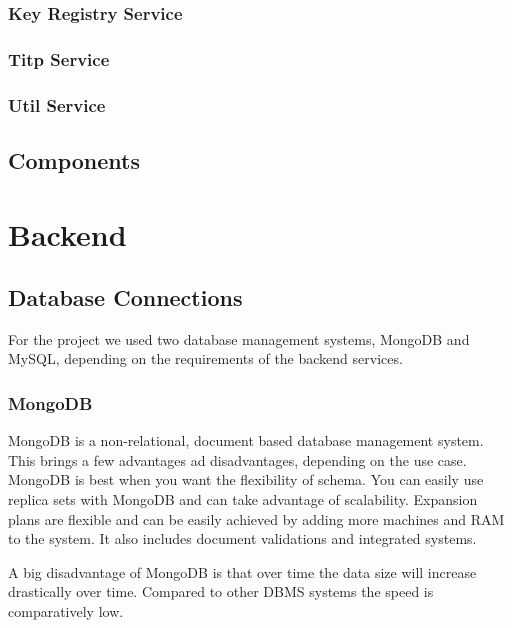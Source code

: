 \subsubsection{Key Registry Service}

\subsubsection{Titp Service}

\subsubsection{Util Service}

\subsection{Components}\label{subsec:components}


\section{Backend}\label{sec:backend}

\subsection{Database Connections}\label{subsec:database-connections}

For the project we used two database management systems, MongoDB and MySQL, depending on the requirements of the backend
services.

\subsubsection{MongoDB}
MongoDB is a non-relational, document based database management system.
This brings a few advantages ad disadvantages, depending on the use case.
MongoDB is best when you want the flexibility of schema.
You can easily use replica sets with MongoDB and can take advantage of scalability.
Expansion plans are flexible and can be easily achieved by adding more machines and RAM to the system.
It also includes document validations and integrated systems.

A big disadvantage of MongoDB is that over time the data size will increase drastically over time.
Compared to other DBMS systems the speed is comparatively low.

